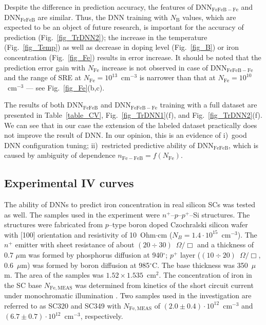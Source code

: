 \documentclass[num-refs]{wiley-article} %
\begin{document}
Despite the difference in prediction accuracy,
the  features of DNN$_\mathrm{FeFeB-Fe}$ and DNN$_\mathrm{FeFeB}$ are similar.
Thus,
the DNN training with $N_\mathrm{B}$ values, which are expected to be an object of future research,
is important for the accuracy of prediction (Fig.~\ref{fig_TrDNN2});
the increase in the temperature (Fig.~\ref{fig_Temp}) as well as decrease
in doping level (Fig.~\ref{fig_B}) or iron concentration (Fig.~\ref{fig_Fe})
results in error increase.
It should be noted that the prediction error gain with $N_\mathrm{Fe}$ increase is not observed in case of DNN$_\mathrm{FeFeB-Fe}$ and
the range of SRE at $N_\mathrm{Fe}=10^{13}$~cm$^{-3}$ is narrower than that at $N_\mathrm{Fe}=10^{10}$~cm$^{-3}$ --- see Fig.~\ref{fig_Fe}(b,c).


The results of both DNN$_\mathrm{FeFeB}$ and DNN$_\mathrm{FeFeB-Fe}$
training with a full dataset are presented in Table~\ref{table_CV}, Fig.~\ref{fig_TrDNN1}(f), and Fig.~\ref{fig_TrDNN2}(f).
We can see that in our case the extension of the labeled dataset practically does not improve the result of DNN.
In our opinion, this is an evidence of
i)~good DNN configuration tuning;
ii)~restricted predictive ability of DNN$_\mathrm{FeFeB}$,
which is caused by ambiguity of dependence $n_\mathrm{Fe-FeB}=f(N_\mathrm{Fe})$.


\subsection{Experimental IV curves}


The ability of DNNs to predict iron concentration in real silicon SCs was tested as well.
The samples used in the experiment were $n^+$--$p$--$p^+$--Si structures.
The structures were fabricated from $p$--type boron doped Czochralski silicon wafer with [100]
orientation and resistivity of 10~Ohm$\cdot$cm ($N_B = 1.4\cdot10^{15}$~cm$^{-3}$).
The $n^+$ emitter with sheet resistance of about $(20\div30)$~$\Omega/\Box$ and a thickness
of $0.7$ $\mu$m was formed by phosphorus diffusion at 940$^\circ$;
$p^+$ layer ($(10\div20)$~$\Omega/\Box$, $0.6$~$\mu$m)
was formed by boron diffusion at 985$^\circ$C.
The base thickness was 350~$\mu$m.
The area of the samples was $1.52\times1.535$~cm$^2$.
The concentration of iron in the SC base $N_\mathrm{Fe,MEAS}$
was determined from kinetics of the short circuit current under monochromatic illumination \cite{2021CMLTP}.
Two samples used in the investigation are referred to as SC320 and SC349 with $N_\mathrm{Fe,MEAS}$
of $(2.0\pm0.4)\cdot10^{12}$~cm$^{-3}$ and $(6.7\pm0.7)\cdot10^{12}$~cm$^{-3}$,
respectively.
\end{document}
